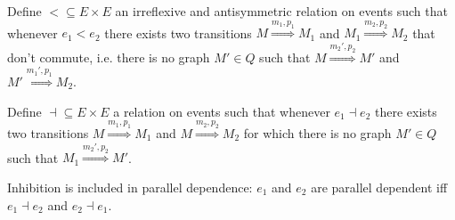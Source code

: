 \begin{definition}
\label{def:seq_dep}
  Define $< \subseteq E\times E$ an irreflexive and antisymmetric relation on events such that whenever $e_1 < e_2$ there exists two transitions $M\overset{m_1,p_1}{\Rightarrow} M_1$ and $M_1\overset{m_2,p_2}{\Rightarrow} M_2$ that don't commute, i.e. there is no graph $M'\in Q$ such that $M\overset{m_2',p_2}{\Rightarrow} M'$ and $M'\overset{m_1',p_1}{\Rightarrow} M_2$. %
\end{definition}

\begin{definition}[Inhibition]
\label{def:inhibition}
  Define $\dashv\subseteq E \times E$ a relation on events such that whenever $e_1\dashv e_2$ there exists two transitions $M\overset{m_1,p_1}{\Rightarrow} M_1$ and $M\overset{m_2,p_2}{\Rightarrow} M_2$ for which there is no graph $M'\in Q$ such that $M_1\overset{m_2',p_2}{\Rightarrow} M'$. %
\end{definition}

\begin{remark}
  Inhibition is included in parallel dependence: $e_1$ and $e_2$ are parallel dependent iff $e_1\dashv e_2$ and $e_2\dashv e_1$.
\end{remark}
